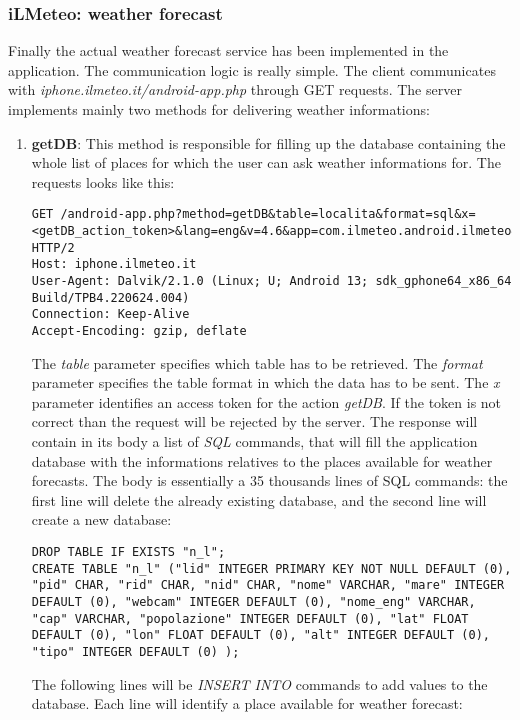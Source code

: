 			\subsubsection{iLMeteo: weather forecast}
				\par Finally the actual weather forecast service has been implemented in the application. The communication logic is really simple. The client communicates with \textit{iphone.ilmeteo.it/android-app.php} through GET requests. The server implements mainly two methods for delivering weather informations:
				\begin{enumerate}
					\item \textbf{getDB}: This method is responsible for filling up the database containing the whole list of places for which the user can ask weather informations for. The requests looks like this:
\begin{lstlisting}
GET /android-app.php?method=getDB&table=localita&format=sql&x=<getDB_action_token>&lang=eng&v=4.6&app=com.ilmeteo.android.ilmeteo&force_3h=0 HTTP/2
Host: iphone.ilmeteo.it
User-Agent: Dalvik/2.1.0 (Linux; U; Android 13; sdk_gphone64_x86_64 Build/TPB4.220624.004)
Connection: Keep-Alive
Accept-Encoding: gzip, deflate
\end{lstlisting}	
						The \textit{table} parameter specifies which table has to be retrieved.
						The \textit{format} parameter specifies the table format in which the data has to be sent.
						The \textit{x} parameter identifies an access token for the action \textit{getDB}. If the token is not correct than the request will be rejected by the server.\newline
						The response will contain in its body a list of \textit{SQL} commands, that will fill the application database with the informations relatives to the places available for weather forecasts. The body is essentially a 35 thousands lines of SQL commands: the first line will delete the already existing database, and the second line will create a new database:
\begin{lstlisting}
DROP TABLE IF EXISTS "n_l";
CREATE TABLE "n_l" ("lid" INTEGER PRIMARY KEY NOT NULL DEFAULT (0), "pid" CHAR, "rid" CHAR, "nid" CHAR, "nome" VARCHAR, "mare" INTEGER DEFAULT (0), "webcam" INTEGER DEFAULT (0), "nome_eng" VARCHAR, "cap" VARCHAR, "popolazione" INTEGER DEFAULT (0), "lat" FLOAT DEFAULT (0), "lon" FLOAT DEFAULT (0), "alt" INTEGER DEFAULT (0), "tipo" INTEGER DEFAULT (0) );
\end{lstlisting}	
						The following lines will be \textit{INSERT INTO} commands to add values to the database. Each line will identify a place available for weather forecast:

\end{enumerate}
